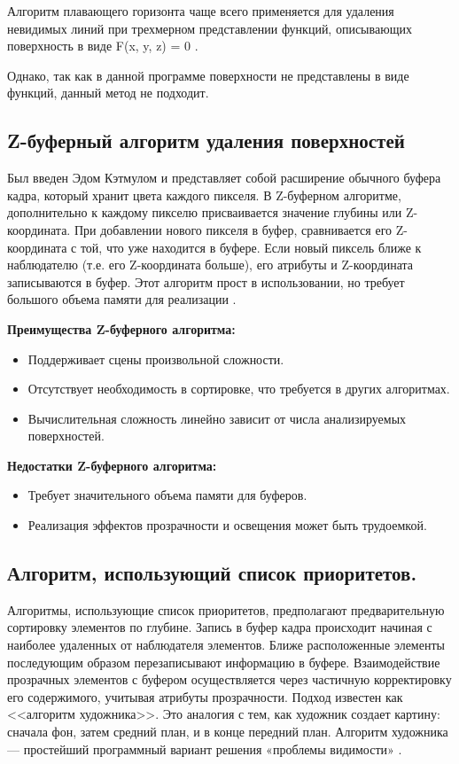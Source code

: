 Алгоритм плавающего горизонта чаще всего применяется для удаления невидимых линий при трехмерном представлении функций, описывающих поверхность в виде F(x, y, z) = 0 \cite{del_line}.

Однако, так как в данной программе поверхности не представлены в виде функций, данный метод не подходит.

\subsection{Z-буферный алгоритм удаления поверхностей}

Был введен Эдом Кэтмулом и представляет собой расширение обычного буфера кадра, который хранит цвета каждого пикселя. В Z-буферном алгоритме, дополнительно к каждому пикселю присваивается значение глубины или Z-координата. При добавлении нового пикселя в буфер, сравнивается его Z-координата с той, что уже находится в буфере. Если новый пиксель ближе к наблюдателю (т.е. его Z-координата больше), его атрибуты и Z-координата записываются в буфер. Этот алгоритм прост в использовании, но требует большого объема памяти для реализации \cite{del_line}. 
    
\textbf{Преимущества Z-буферного алгоритма:}
\begin{itemize}
\item Поддерживает сцены произвольной сложности.
\item Отсутствует необходимость в сортировке, что требуется в других алгоритмах.
\item Вычислительная сложность линейно зависит от числа анализируемых поверхностей.
\end{itemize}

\textbf{Недостатки Z-буферного алгоритма:}
\begin{itemize}
\item Требует значительного объема памяти для буферов.
\item Реализация эффектов прозрачности и освещения может быть трудоемкой.
\end{itemize}

\subsection{Алгоритм, использующий список приоритетов.}

Алгоритмы, использующие список приоритетов, предполагают предварительную сортировку элементов по глубине. Запись в буфер кадра происходит начиная с наиболее удаленных от наблюдателя элементов. Ближе расположенные элементы последующим образом перезаписывают информацию в буфере. Взаимодействие прозрачных элементов с буфером осуществляется через частичную корректировку его содержимого, учитывая атрибуты прозрачности. Подход известен как <<алгоритм художника>>. Это аналогия с тем, как художник создает картину: сначала фон, затем средний план, и в конце передний план. Алгоритм художника --- простейший программный вариант решения «проблемы видимости» \cite{light, del_line}. 

